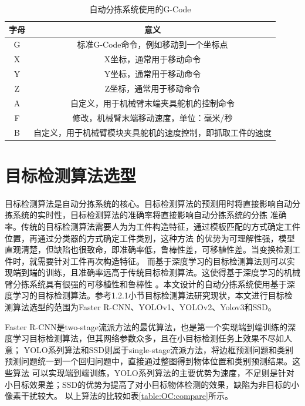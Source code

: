 {
    \begin{table}[htb] 
        \caption{自动分拣系统使用的G-Code}
        \label{table:G-code:introduction}
        \centering
        \begin{tabular}[t]{c|c}
            \hline
            字母 & 意义  \\
            \hline
            G   & 标准G-Code命令，例如移动到一个坐标点 \\
            \hline 
            X   & X坐标，通常用于移动命令 \\
            \hline
            Y   & Y坐标，通常用于移动命令 \\
            \hline
            Z   & Z坐标，通常用于移动命令 \\
            \hline
            A   & 自定义，用于机械臂末端夹具舵机的控制命令\\
            \hline
            F   & 修改，机械臂末端移动速度，单位：毫米/秒 \\
            \hline
            B   & 自定义，用于机械臂模块夹具舵机的速度控制，即抓取工件的速度\\
            \hline
        \end{tabular} 
    \end{table}
}


\section{目标检测算法选型}

目标检测算法是自动分拣系统的核心。目标检测算法的预测用时将直接影响自动分拣系统的实时性，目标检测算法的准确率将直接影响自动分拣系统的分拣
准确率。传统的目标检测算法需要人为为工件构造特征，通过模板匹配的方式确定工件位置，再通过分类器的方式确定工件类别，这种方法
的优势为可理解性强，模型直观清楚，但缺陷也很致命，即准确率低，鲁棒性差，可移植性差。当变换检测工件时，就需要针对工件再次构造特征。
而基于深度学习的目标检测算法则可以实现端到端的训练，且准确率远高于传统目标检测算法。这使得基于深度学习的机械臂分拣系统具有很强的可移植性和鲁棒性
。本文设计的自动分拣系统使用基于深度学习的目标检测算法。参考1.2.1小节目标检测算法研究现状，本文进行目标检测算法选型的范围为Faster R-CNN、YOLOv1、YOLOv2、Yolov3和SSD。

Faster R-CNN是two-stage流派方法的最优算法，也是第一个实现端到端训练的深度学习目标检测算法，但其网络参数众多，且在小目标检测任务上效果不尽如人意；
YOLO系列算法和SSD则属于single-stage流派方法，将边框预测问题和类别预测问题统一到一个回归问题中，直接通过整图得到物体位置和类别预测结果。这些算法
可以实现端到端训练，YOLO系列算法的主要优势为速度，不足则是针对小目标效果差；SSD的优势为提高了对小目标物体检测的效果，缺陷为非目标的小像素干扰较大。
以上算法的比较如表\ref{table:OC:compare}所示。


